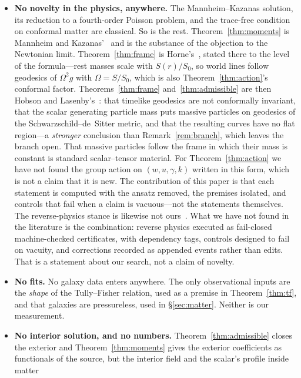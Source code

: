 \documentclass[11pt]{article}
\theoremstyle{definition}
\theoremstyle{remark}
\begin{document}
\begin{itemize}\itemsep2pt
\item \textbf{No novelty in the physics, anywhere.}  The Mannheim--Kazanas
  solution, its reduction to a fourth-order Poisson problem, and the
  trace-free condition on conformal matter are classical.  So is the rest.
  Theorem~\ref{thm:moments} is Mannheim and Kazanas'~\cite{MK1994} and is the
  substance of the objection to the Newtonian limit.
  Theorem~\ref{thm:frame} is Horne's~\cite{Horne2016}, stated there to the level
  of the formula---rest masses scale with \(S(r)/S_{0}\), so world lines follow
  geodesics of \(\Omega^{2}g\) with \(\Omega=S/S_{0}\), which is also
  Theorem~\ref{thm:action}'s conformal factor.  Theorems~\ref{thm:frame}
  and~\ref{thm:admissible} are then Hobson and Lasenby's~\cite{HobsonLasenby2021}: that timelike geodesics are not
  conformally invariant, that the scalar generating particle mass puts massive
  particles on geodesics of the Schwarzschild--de~Sitter metric, and that the
  resulting curves have no flat region---a \emph{stronger} conclusion than
  Remark~\ref{rem:branch}, which leaves the branch open.  That massive
  particles follow the frame in which their mass is constant is standard
  scalar--tensor material.  For Theorem~\ref{thm:action} we have not found the
  group action on \((w,u,\gamma,k)\) written in this form, which is not a
  claim that it is new.  The contribution of this paper is that each statement
  is computed with the ansatz removed, the premises isolated, and controls
  that fail when a claim is vacuous---not the statements themselves.  The
  reverse-physics stance is likewise not ours~\cite{CarcassiAidala2022,AoP}.
  What we have not found in the literature is the combination: reverse physics
  executed as fail-closed machine-checked certificates, with dependency tags,
  controls designed to fail on vacuity, and corrections recorded as appended
  events rather than edits.  That is a statement about our search, not a claim
  of novelty.
\item \textbf{No fits.} No galaxy data enters anywhere.  The only
  observational inputs are the \emph{shape} of the Tully--Fisher relation,
  used as a premise in Theorem~\ref{thm:tf}, and that galaxies are
  pressureless, used in \S\ref{sec:matter}.  Neither is our measurement.
\item \textbf{No interior solution, and no numbers.}
  Theorem~\ref{thm:admissible} closes the exterior and
  Theorem~\ref{thm:moments} gives the exterior coefficients as functionals of
  the source, but the interior field and the scalar's profile inside matter

\end{itemize}
\end{document}
